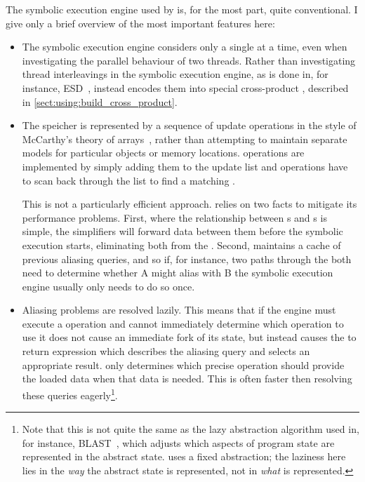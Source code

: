 The symbolic execution engine used by {\implementation} is, for the
most part, quite conventional.  I give only a brief overview of the
most important features here:
\begin{itemize}
\item The symbolic execution engine considers only a single
  {\StateMachine} at a time, even when investigating the parallel
  behaviour of two threads.  Rather than investigating thread
  interleavings in the symbolic execution engine, as is done in, for
  instance, ESD~\cite{Zamfir2010}, {\technique} instead encodes them
  into special cross-product {\StateMachines}, described in
  \autoref{sect:using:build_cross_product}.

\item The {\StateMachine} speicher is represented by a sequence of
  update operations in the style of McCarthy's theory of
  arrays~\cite{McCarthy1962}, rather than attempting to maintain
  separate models for particular objects or memory locations.
   operations are implemented by simply adding them to
  the update list and  operations have to scan back
  through the list to find a matching .

  This is not a particularly efficient approach.  {\Implementation}
  relies on two facts to mitigate its performance problems.  First,
  where the relationship between s and s is
  simple, the {\StateMachine} simplifiers will forward data between
  them before the symbolic execution starts, eliminating both from the
  {\StateMachine}.  Second, {\implementation} maintains a cache of
  previous aliasing queries, and so if, for instance, two paths
  through the {\StateMachine} both need to determine whether
   A might alias with  B the symbolic
  execution engine usually only needs to do so once.

\item Aliasing problems are resolved lazily.  This means that if the
  engine must execute a  operation and cannot immediately
  determine which  operation to use it does not cause an
  immediate fork of its state, but instead causes the  to
  return {\AStateMachine} expression which describes the aliasing
  query and selects an appropriate result.  {\Implementation} only
  determines which precise  operation should provide the
  loaded data when that data is needed.  This is often faster then
  resolving these queries eagerly\footnote{Note that this is not quite
    the same as the lazy abstraction algorithm used in, for instance,
    BLAST~\cite{Henzinger2002}, which adjusts which aspects of program
    state are represented in the abstract state.  {\Implementation}
    uses a fixed abstraction; the laziness here lies in the \emph{way}
    the abstract state is represented, not in \emph{what} is
    represented.}.


\end{itemize}
